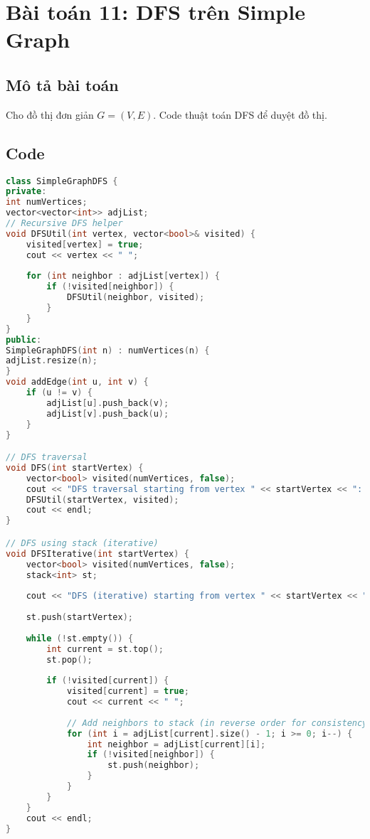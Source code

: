 \documentclass[12pt]{article}
\begin{document}
\section{Bài toán 11: DFS trên Simple Graph}
\subsection{Mô tả bài toán}
Cho đồ thị đơn giản $G = (V, E)$. Code thuật toán DFS để duyệt đồ thị.
\subsection{Code}
\begin{lstlisting}[language=C++, caption=DFS cho Simple Graph]
class SimpleGraphDFS {
private:
int numVertices;
vector<vector<int>> adjList;
// Recursive DFS helper
void DFSUtil(int vertex, vector<bool>& visited) {
    visited[vertex] = true;
    cout << vertex << " ";
    
    for (int neighbor : adjList[vertex]) {
        if (!visited[neighbor]) {
            DFSUtil(neighbor, visited);
        }
    }
}
public:
SimpleGraphDFS(int n) : numVertices(n) {
adjList.resize(n);
}
void addEdge(int u, int v) {
    if (u != v) {
        adjList[u].push_back(v);
        adjList[v].push_back(u);
    }
}

// DFS traversal
void DFS(int startVertex) {
    vector<bool> visited(numVertices, false);
    cout << "DFS traversal starting from vertex " << startVertex << ": ";
    DFSUtil(startVertex, visited);
    cout << endl;
}

// DFS using stack (iterative)
void DFSIterative(int startVertex) {
    vector<bool> visited(numVertices, false);
    stack<int> st;
    
    cout << "DFS (iterative) starting from vertex " << startVertex << ": ";
    
    st.push(startVertex);
    
    while (!st.empty()) {
        int current = st.top();
        st.pop();
        
        if (!visited[current]) {
            visited[current] = true;
            cout << current << " ";
            
            // Add neighbors to stack (in reverse order for consistency)
            for (int i = adjList[current].size() - 1; i >= 0; i--) {
                int neighbor = adjList[current][i];
                if (!visited[neighbor]) {
                    st.push(neighbor);
                }
            }
        }
    }
    cout << endl;
}


\end{lstlisting}
\end{document}
